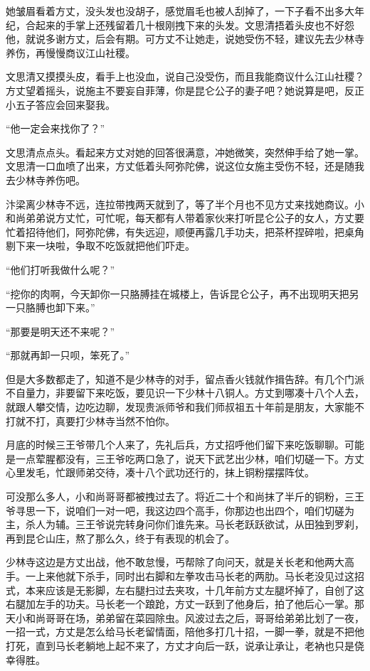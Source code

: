她皱眉看着方丈，没头发也没胡子，感觉眉毛也被人刮掉了，一下子看不出多大年纪，合起来的手掌上还残留着几十根刚拽下来的头发。文思清捂着头皮也不好怨他，就说多谢方丈，后会有期。可方丈不让她走，说她受伤不轻，建议先去少林寺养伤，再慢慢商议江山社稷。

文思清又摸摸头皮，看手上也没血，说自己没受伤，而且我能商议什么江山社稷？方丈望着摇头，说施主不要妄自菲薄，你是昆仑公子的妻子吧？她说算是吧，反正小五子答应会回来娶我。

“他一定会来找你了？”

文思清点点头。看起来方丈对她的回答很满意，冲她微笑，突然伸手给了她一掌。文思清一口血喷了出来，方丈低着头阿弥陀佛，说这位女施主受伤不轻，还是随我去少林寺养伤吧。

汴梁离少林寺不远，连拉带拽两天就到了，等了半个月也不见方丈来找她商议。小和尚弟弟说方丈忙，可忙呢，每天都有人带着家伙来打听昆仑公子的女人，方丈要忙着招待他们，阿弥陀佛，有失远迎，顺便再露几手功夫，把茶杯捏碎啦，把桌角剔下来一块啦，争取不吃饭就把他们吓走。

“他们打听我做什么呢？”

“挖你的肉啊，今天卸你一只胳膊挂在城楼上，告诉昆仑公子，再不出现明天把另一只胳膊也卸下来。”

“那要是明天还不来呢？”

“那就再卸一只呗，笨死了。”

但是大多数都走了，知道不是少林寺的对手，留点香火钱就作揖告辞。有几个门派不自量力，非要留下来吃饭，要见识一下少林十八铜人。方丈到哪凑十八个人去，就跟人攀交情，边吃边聊，发现贵派师爷和我们师叔祖五十年前是朋友，大家能不打就不打，真要打少林寺当然不怕你。

月底的时候三王爷带几个人来了，先礼后兵，方丈招呼他们留下来吃饭聊聊。可能是一点荤腥都没有，三王爷吃两口急了，说天下武艺出少林，咱们切磋一下。方丈心里发毛，忙跟师弟交待，凑十八个武功还行的，抹上铜粉摆摆阵仗。

可没那么多人，小和尚哥哥都被拽过去了。将近二十个和尚抹了半斤的铜粉，三王爷寻思一下，说咱们一对一吧，我这边四个高手，你那边也出四个，咱们切磋为主，杀人为辅。三王爷说完转身问你们谁先来。马长老跃跃欲试，从田独到罗刹，再到昆仑山庄，熬了那么久，终于有表现的机会了。

少林寺这边是方丈出战，他不敢怠慢，丐帮除了向问天，就是关长老和他两大高手。一上来他就下杀手，同时出右脚和左拳攻击马长老的两肋。马长老没见过这招式，本来应该是无影脚，左右腿扫过去夹攻，十几年前方丈左腿坏掉了，自创了这右腿加左手的功夫。马长老一个踉跄，方丈一跃到了他身后，拍了他后心一掌。那天小和尚哥哥在场，弟弟留在菜园除虫。风波过去之后，哥哥给弟弟比划了一夜，一招一式，方丈是怎么给马长老留情面，陪他多打几十招，一脚一拳，就是不把他打死，直到马长老躺地上起不来了，方丈才向后一跃，说承让承让，老衲也只是侥幸得胜。

